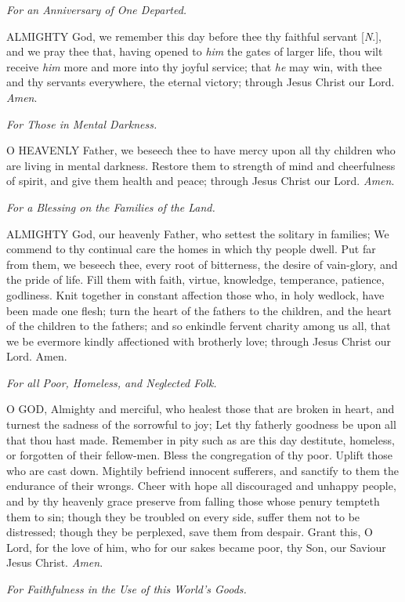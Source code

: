 \emph{For
an Anniversary of One Departed.}

ALMIGHTY
God, we remember this day before thee thy faithful servant [\emph{N}.],
and we pray thee that, having opened to \emph{him} the gates of larger
life, thou wilt receive \emph{him} more and more into thy joyful service;
that \emph{he} may win, with thee and thy servants everywhere, the
eternal victory; through Jesus Christ our Lord. \emph{Amen}.

\emph{For Those in Mental Darkness.}

O HEAVENLY Father, we beseech
thee to have mercy upon all thy children who are living in mental darkness.
Restore them to strength of mind and cheerfulness of spirit, and give
them health and peace; through Jesus Christ our Lord. \emph{Amen}.

\emph{For a Blessing on the Families of the Land.}

ALMIGHTY God, our heavenly
Father, who settest the solitary in families; We commend to thy continual
care the homes in which thy people dwell. Put far from them, we beseech
thee, every root of bitterness, the desire of vain-glory, and the pride
of life. Fill them with faith, virtue, knowledge, temperance, patience,
godliness. Knit together in constant affection those who, in holy wedlock,
have been made one flesh; turn the heart of the fathers to the children,
and the heart of the children to the fathers; and so enkindle fervent
charity among us all, that we be evermore kindly affectioned with brotherly
love; through Jesus Christ our Lord. Amen.

\emph{For all Poor, Homeless, and Neglected Folk.}

O GOD, Almighty and merciful,
who healest those that are broken in heart, and turnest the sadness of
the sorrowful to joy; Let thy fatherly goodness be upon all that thou
hast made. Remember in pity such as are this day destitute, homeless,
or forgotten of their fellow-men. Bless the congregation of thy poor.
Uplift those who are cast down. Mightily befriend innocent sufferers,
and sanctify to them the endurance of their wrongs. Cheer with hope all
discouraged and unhappy people, and by thy heavenly grace preserve from
falling those whose penury tempteth them to sin; though they be troubled
on every side, suffer them not to be distressed; though they be perplexed,
save them from despair. Grant this, O Lord, for the love of him, who for
our sakes became poor, thy Son, our Saviour Jesus Christ. \emph{Amen}.

\emph{For Faithfulness in the Use of this World’s
Goods.}

